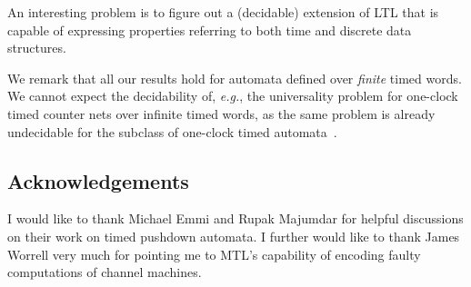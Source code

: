 \documentclass{CSML}
\theoremstyle{plain}\newtheorem{theorem}[thm]{Theorem}
\theoremstyle{plain}\newtheorem{corollary}[thm]{Corollary}
\theoremstyle{plain}\newtheorem{example}[thm]{Example}
\theoremstyle{plain}\newtheorem{lemma}[thm]{Lemma}
\theoremstyle{plain}\newtheorem{remark}[thm]{Remark}
\def\eg{{\em e.g.}}
\begin{document}
An interesting problem is to figure out a (decidable) extension of LTL that is capable of expressing properties referring to both time and discrete data structures. 

We remark that all our results hold for automata defined over \emph{finite} timed words. 
We cannot expect the decidability of, \eg, the universality problem for one-clock timed counter nets over infinite timed words, as the same problem is already undecidable for the subclass of one-clock timed automata~\cite{DBLP:journals/fuin/AbdullaDOQW08}. 



\subsection*{Acknowledgements}
I would like to thank Michael Emmi and Rupak Majumdar for helpful discussions on their work on timed pushdown automata. 
I further would like to thank James Worrell  very much for pointing me to MTL's capability of encoding faulty computations of channel machines.
\end{document}
